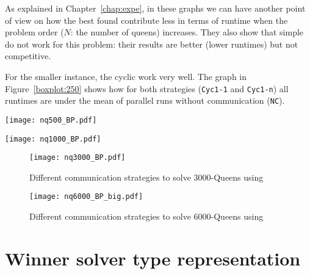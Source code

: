 As explained in Chapter~\ref{chap:expe}, in these graphs we can have another point of view on how the best found \commstr{} contribute less in terms of runtime when the problem order ($N$: the number of queens) increases. They also show that simple \commstrs{} do not work for this problem: their results are better (lower runtimes) but not competitive.

For the smaller instance, the cyclic \commstr{} work very well. The graph in Figure~\ref{boxplot:250} shows how for both strategies (\texttt{Cyc1-1} and \texttt{Cyc1-n}) all runtimes are under the mean of parallel runs without communication (\texttt{NC}).


\begin{minipage}[c]{0.45\textwidth}
\centering
\texttt{[image: nq500\_BP.pdf]}
\label{boxplot:500}
\end{minipage}\hspace{0.05\textwidth}
\begin{minipage}[c]{0.45\textwidth}
\centering
\texttt{[image: nq1000\_BP.pdf]}
\label{boxplot:1000}
\end{minipage}

\begin{figure}[!h]
\centering
\texttt{[image: nq3000\_BP.pdf]}
\caption{Different communication strategies to solve 3000-Queens using \posl}\label{boxplot:3000}
\end{figure}

\begin{figure}[!h]
\centering
\texttt{[image: nq6000\_BP\_big.pdf]}
\caption{Different communication strategies to solve 6000-Queens using \posl}\label{boxplot:6000}
\end{figure}

\newpage

\section{Winner solver type representation}

